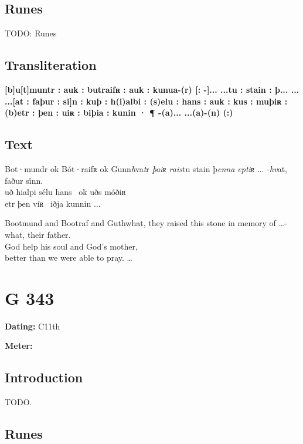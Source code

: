 \subsection{Runes}

TODO: Runes%

\subsection{Transliteration}

\textbf{[b]u[t]muntr : auk : butraifʀ : auk : kunua-(r) [: -]... ...tu : stain : þ... ... ...[at : faþur : si]n : kuþ : h(i)albi : (s)elu : hans : auk : kus : muþiʀ : (b)etr : þen : uiʀ : biþia : kunin · ¶ -(a)... ...(a)-(n) (:)}

\subsection{Text}

\bpg\bpa[0]%
\startsub Bot·mundr ok Bót·raifʀ ok Gunn\emph{h}va\emph{t}r \emph{þaiʀ rais}tu stain þ\emph{enna eptiʀ} ... \emph{-hv}at, faður si̇nn.\endsub \\
uð hialpi sélu hans \hld\ ok uðs móðiʀ \\
etr þen víʀ \hld\ iðja kunnin ...\epa

\bpb Bootmund and Bootraf and Guthwhat, they raised this stone in memory of \dots-what, their father. \\
God help his soul and God’s mother, \\
better than we were able to pray. \dots\epb\epg

\sectionline\clearpage


\section{G 343}

\begin{flushright}%
\textbf{Dating:} C11th

\textbf{Meter:} \Fornyrdislag
\end{flushright}%

\subsection{Introduction}

TODO.

\subsection{Runes}

